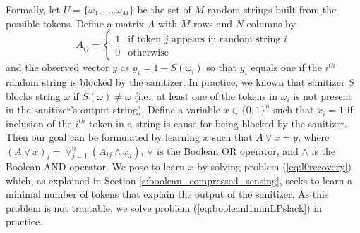 Formally, let $U=\{\omega_1,\ldots,\omega_M\}$ be the set of $M$ random strings built from the possible tokens.  Define a matrix $A$ with $M$ rows and $N$ columns by 
\[A_{ij}=
\begin{cases} 1 &\mbox{if token } j \mbox{ appears in random string } i \\
0 & \mbox{otherwise}
\end{cases} 
\]
and the observed vector $y$ as $y_i=1-S(\omega_i)$ so that $y_i$ equals one if the $i^{th}$ random string is blocked by the sanitizer.  In practice, we known that sanitizer $S$ blocks string $\omega$ if $S(\omega)\neq\omega$ (i.e., at least one of the tokens in $\omega_i$ is not present in the sanitizer's output string).  Define a variable $x\in\{0,1\}^n$ such that $x_i=1$ if inclusion of the $i^{th}$ token in a string is cause for being blocked by the sanitizer.  Then our goal can be formulated by learning $x$ such that $A\vee x=y$, where $(A\vee x)_i=\vee_{j=1}^n(A_{ij}\wedge x_j)$, $\vee$ is the Boolean OR operator, and $\wedge$ is the Boolean AND operator.  We pose to learn $x$ by solving problem (\ref{eq:l0recovery}) which, as explained in Section \ref{s:boolean_compressed_sensing}, seeks to learn a minimal number of tokens that explain the output of the sanitizer. As this problem is not tractable, we solve problem (\ref{eq:booleanl1minLPslack}) in practice. 

